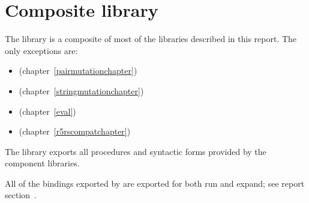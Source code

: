 \chapter{Composite library}
\label{complibchapter}

The  library is a composite of most of the libraries
described in this report.  The only exceptions are:
%
\begin{itemize}
\item {} (chapter~\ref{pairmutationchapter})
\item {} (chapter~\ref{stringmutationchapter})
\item {} (chapter~\ref{eval})
\item {} (chapter~\ref{r5rscompatchapter})
\end{itemize}
%
The library exports all procedures and syntactic forms provided by the
component libraries.

All of the bindings exported by  are exported for both {\cf run}
and {\cf expand}; see report section~.

